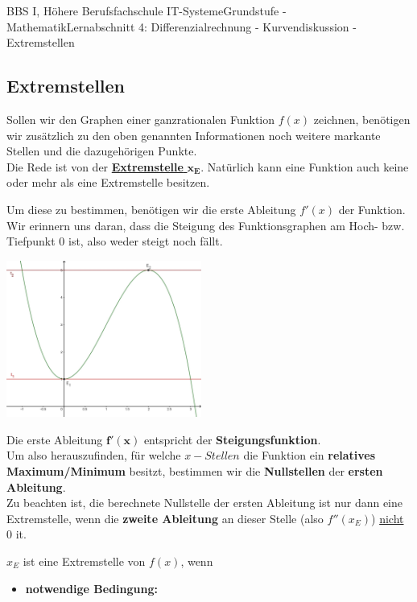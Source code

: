\documentclass[11pt,twocolumn,oneside,openany,headings=optiontotoc,11pt,numbers=noenddot]{article}
\begin{document}
\begin{worksheet}{BBS I, Höhere Berufsfachschule IT-Systeme}{Grundstufe - Mathematik}{Lernabschnitt 4: Differenzialrechnung - Kurvendiskussion - Extremstellen}
		\subsection{Extremstellen}
		Sollen wir den Graphen einer ganzrationalen Funktion \(f(x)\) zeichnen, benötigen wir zusätzlich zu den oben genannten Informationen noch weitere markante Stellen und die dazugehörigen Punkte.\\
		Die Rede ist von der \underline{\textbf{Extremstelle} \(\mathbf{x_{E}}\)}. Natürlich kann eine Funktion auch keine oder mehr als eine Extremstelle besitzen.\\
		\par\noindent
		Um diese zu bestimmen, benötigen wir die erste Ableitung \(f'(x)\) der Funktion.\\
		Wir erinnern uns daran, dass die Steigung des Funktionsgraphen am Hoch- bzw. Tiefpunkt 0 ist, also weder steigt noch fällt.\\
		\par\noindent
		\includegraphics[width=0.48\textwidth]{../99_Bilder/042_EST_Tang.jpg}\\
		\par\noindent
		Die erste Ableitung \(\mathbf{f'(x)}\) entspricht der \textbf{Steigungsfunktion}.\\
		Um also herauszufinden, für welche \(x-Stellen\) die Funktion ein \textbf{relatives Maximum/Minimum} besitzt, bestimmen wir die \textbf{Nullstellen} der \textbf{ersten Ableitung}.\\
		\normalcolor{} Zu beachten ist, die berechnete Nullstelle der ersten Ableitung ist nur dann eine Extremstelle, wenn die \textbf{zweite Ableitung} an dieser Stelle (also \(f''(x_E)\)) \underline{nicht} 0 it.
		\begin{framed}
			\noindent
			\(x_E\) ist eine Extremstelle von \(f(x)\), wenn
			\begin{itemize}[label=-]
				\item \textbf{notwendige Bedingung:}\\

\end{itemize}
\end{framed}
\end{worksheet}
\end{document}

